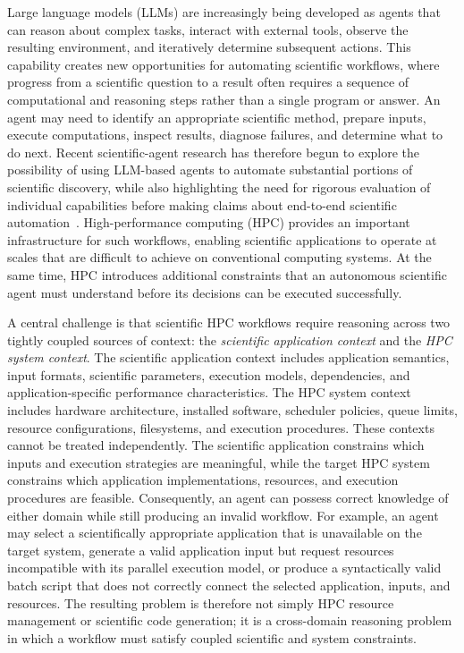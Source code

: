 \documentclass[conference]{IEEEtran}
\begin{document}
Large language models (LLMs) are increasingly being developed as agents that can reason about complex tasks, interact with external tools, observe the resulting environment, and iteratively determine subsequent actions. This capability creates new opportunities for automating scientific workflows, where progress from a scientific question to a result often requires a sequence of computational and reasoning steps rather than a single program or answer. An agent may need to identify an appropriate scientific method, prepare inputs, execute computations, inspect results, diagnose failures, and determine what to do next. Recent scientific-agent research has therefore begun to explore the possibility of using LLM-based agents to automate substantial portions of scientific discovery, while also highlighting the need for rigorous evaluation of individual capabilities before making claims about end-to-end scientific automation~\cite{chen2025scienceagentbench}. High-performance computing (HPC) provides an important infrastructure for such workflows, enabling scientific applications to operate at scales that are difficult to achieve on conventional computing systems. At the same time, HPC introduces additional constraints that an autonomous scientific agent must understand before its decisions can be executed successfully.

A central challenge is that scientific HPC workflows require reasoning across two tightly coupled sources of context: the \textit{scientific application context} and the \textit{HPC system context}. The scientific application context includes application semantics, input formats, scientific parameters, execution models, dependencies, and application-specific performance characteristics. The HPC system context includes hardware architecture, installed software, scheduler policies, queue limits, resource configurations, filesystems, and execution procedures. These contexts cannot be treated independently. The scientific application constrains which inputs and execution strategies are meaningful, while the target HPC system constrains which application implementations, resources, and execution procedures are feasible. Consequently, an agent can possess correct knowledge of either domain while still producing an invalid workflow. For example, an agent may select a scientifically appropriate application that is unavailable on the target system, generate a valid application input but request resources incompatible with its parallel execution model, or produce a syntactically valid batch script that does not correctly connect the selected application, inputs, and resources. The resulting problem is therefore not simply HPC resource management or scientific code generation; it is a cross-domain reasoning problem in which a workflow must satisfy coupled scientific and system constraints.
\end{document}

